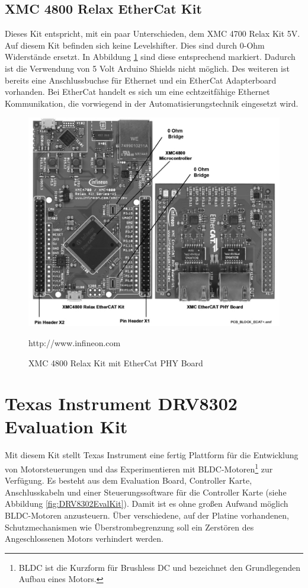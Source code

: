 

\subsection{XMC 4800 Relax EtherCat Kit}
\label{sec:XMC4800}
Dieses Kit entspricht, mit ein paar Unterschieden, dem XMC 4700 Relax Kit 5V.
Auf diesem Kit befinden sich keine Levelshifter.
Dies sind durch 0-Ohm Widerstände ersetzt.
In Abbildung \ref{fig:XMC4800} sind diese entsprechend markiert.
Dadurch ist die Verwendung von 5 Volt Arduino Shields nicht möglich.
Des weiteren ist bereits eine Anschlussbuchse für Ethernet und ein EtherCat Adapterboard vorhanden.
Bei EtherCat handelt es sich um eine echtzeitfähige Ethernet Kommunikation, die vorwiegend in der Automatisierungstechnik eingesetzt wird. 

\begin{figure}[hptb]
	\centering
	\includegraphics[width=\textwidth-4cm]{hardware/graphics/XMC_4800_Board_with_EtherCAT}
	\caption{XMC 4800 Relax Kit mit EtherCat PHY Board}
	\quelle http://www.infineon.com
	\label{fig:XMC4800}
\end{figure}



\section{Texas Instrument DRV8302 Evaluation Kit}	
\label{sec:TI DRV8302 EvalKit}
Mit diesem Kit stellt Texas Instrument eine fertig Plattform für die Entwicklung von Motorsteuerungen und das Experimentieren mit BLDC-Motoren\footnote{BLDC ist die Kurzform für Brushless DC und bezeichnet den Grundlegenden Aufbau eines Motors.} zur Verfügung.
Es besteht aus dem Evaluation Board, Controller Karte, Anschlusskabeln und einer Steuerungssoftware für die Controller Karte (siehe Abbildung \ref{fig:DRV8302EvalKit}).
Damit ist es ohne großen Aufwand möglich BLDC-Motoren anzusteuern.
Über verschiedene, auf der Platine vorhandenen, Schutzmechanismen wie Überstrombegrenzung soll ein Zerstören des Angeschlossenen Motors verhindert werden.

